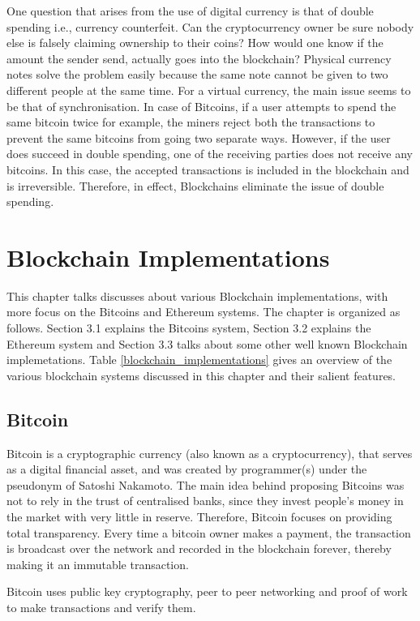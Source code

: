 \documentclass[english]{tktltiki}
\begin{document}
One question that arises from the use of digital currency is that of double spending \cite{bitcoin} i.e., currency counterfeit. Can the cryptocurrency owner be sure nobody else is falsely claiming ownership to their coins? How would one know if the amount the sender send, actually goes into the blockchain? Physical currency notes solve the problem easily because the same note cannot be given to two different people at the same time. For a virtual currency, the main issue seems to be that of synchronisation. In case of Bitcoins, if a user attempts to spend the same bitcoin twice for example, the miners reject both the transactions to prevent the same bitcoins from going two separate ways. However, if the user does succeed in double spending, one of the receiving parties does not receive any bitcoins. In this case, the accepted transactions is included in the blockchain and is irreversible. Therefore, in effect, Blockchains eliminate the issue of double spending.

\newpage
\section{Blockchain Implementations}
This chapter talks discusses about various Blockchain implementations, with more focus on the Bitcoins and Ethereum systems. The chapter is organized as follows. Section 3.1 explains the Bitcoins system, Section 3.2 explains the Ethereum system and Section 3.3 talks about some other well known Blockchain implemetations. Table \ref{blockchain_implementations} gives an overview of the various blockchain systems discussed in this chapter and their salient features. 

\subsection{Bitcoin}

Bitcoin is a cryptographic currency (also known as a cryptocurrency), that serves as a digital financial asset, and was created by programmer(s) under the pseudonym of Satoshi Nakamoto. The main idea behind proposing Bitcoins was not to rely in the trust of centralised banks, since they invest people's money in the market with very little in reserve\cite{bitcoin}. Therefore, Bitcoin focuses on providing total transparency. Every time a bitcoin owner makes a payment, the transaction is broadcast over the network and recorded in the blockchain forever, thereby making it an immutable transaction.

Bitcoin uses public key cryptography, peer to peer networking and proof of work to make transactions and verify them. 
\end{document}
